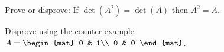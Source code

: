 
\begin{Exercise}[
name={},
title={}, 
difficulty=0,
origin={\cite{YL}}]
Prove or disprove: If $\det(A^2)=\det(A)$ then $A^2=A$.
\end{Exercise}

\begin{Answer}
Disprove using the counter example $A=\begin{mat}
0 & 1\\
0 & 0
\end{mat}
$.
\end{Answer}
